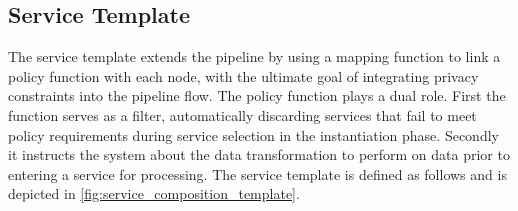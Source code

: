 \subsection{Service Template}



%




The service template extends the pipeline by using a mapping function to link a policy function with each node, with the ultimate goal of integrating privacy constraints into the pipeline flow.
The policy function plays a dual role.
First the function serves as a filter, automatically discarding services that fail to meet policy requirements during service selection in the instantiation phase. Secondly
it instructs the system about the data transformation to perform on data prior to entering a service for processing.
The service template is defined as follows and is depicted in \cref{fig:service_composition_template}.

